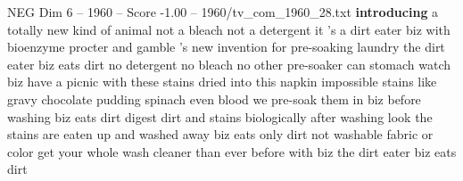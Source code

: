 \begin{textsample}{NEG Dim 6 – 1960 – Score -1.00 – 1960/tv\_com\_1960\_28.txt}  \label{ex:f6_neg_077}
\textbf{introducing} a totally new kind of animal not a bleach not a detergent it 's a dirt eater biz with bioenzyme procter and gamble 's new invention for pre-soaking laundry the dirt eater biz eats dirt no detergent no bleach no other pre-soaker can stomach watch biz have a picnic with these stains dried into this napkin impossible stains like gravy chocolate pudding spinach even blood we pre-soak them in biz before washing biz eats dirt digest dirt and stains biologically after washing look the stains are eaten up and washed away biz eats only dirt not washable fabric or color get your whole wash cleaner than ever before with biz the dirt eater biz eats dirt

\end{textsample}
